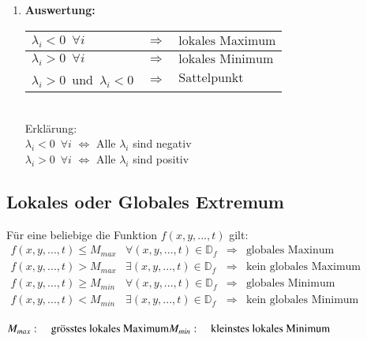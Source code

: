 \begin{enumerate}
    \item \textbf{Auswertung:}\\
    
    \begin{tabular}{lll}
        \hline
        $\lambda_i < 0 \,\,\,\forall i$ &$\Longrightarrow$& $\text{lokales Maximum}$\\
        \hline
        $\lambda_i > 0 \,\,\,\forall i$ &$\Longrightarrow$& $\text{lokales Minimum}$\\
        \hline
        $\lambda_i > 0\,$ und $\,\lambda_i < 0$ &$\Longrightarrow$& $\text{Sattelpunkt}$\\
        \hline
    \end{tabular}\\

    Erklärung:\\
    $\lambda_i < 0 \,\,\,\forall i$ $\Leftrightarrow $ Alle $\lambda_i$ sind negativ\\
    $\lambda_i > 0 \,\,\,\forall i$ $\Leftrightarrow $ Alle $\lambda_i$ sind positiv\\
\end{enumerate}

\newcolumn
\subsection{Lokales oder Globales Extremum}
Für eine beliebige die Funktion $f(x, y, ... , t)$ gilt:\\

$\boxed{\begin{array}{llll}
    f(x,y,...,t)\leq M_{max}&\forall(x,y,...,t)\in\mathbb{D}_f&\Rightarrow&\text{globales Maxinum}\\
    f(x,y,...,t)>M_{max}&\exists(x,y,...,t)\in\mathbb{D}_f&\Rightarrow&\text{kein globales Maximum}\\
    \hline f(x,y,...,t)\geq M_{min}&\forall(x,y,...,t)\in\mathbb{D}_f&\Rightarrow&\text{globales Minimum}\\
    f(x,y,...,t)<M_{min}&\exists(x,y,...,t)\in\mathbb{D}_f&\Rightarrow&\text{kein globales Minimum}
\end{array}}$\\
\\
$M_{max}:\quad\text{grösstes lokales Maximum}\\
M_{min}:\quad\text{kleinstes lokales Minimum}$\\









